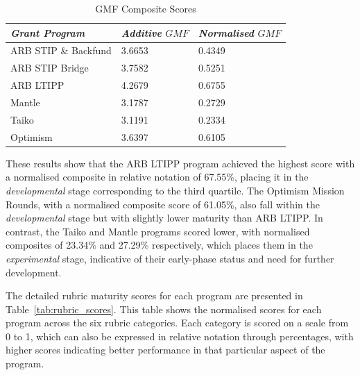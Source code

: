 \documentclass[conference]{IEEEtran}
\begin{document}
\begin{table}[htbp]
\caption{GMF Composite Scores}
\centering
\footnotesize
\begin{tabular}{p{2.7cm}p{2cm}p{2.3cm}}
\hline
\textbf{\textit{Grant Program}} & \textbf{\textit{Additive} \( GMF\)} & \textbf{\textit{Normalised} \( GMF \)} \\
\hline
ARB STIP \& Backfund & 3.6653 & 0.4349 \\
ARB STIP Bridge & 3.7582 & 0.5251 \\
ARB LTIPP & 4.2679 & 0.6755 \\
Mantle & 3.1787 & 0.2729 \\
Taiko & 3.1191 & 0.2334 \\
Optimism & 3.6397 & 0.6105 \\
\hline
\end{tabular}
\label{tab:gmf_composite_score}
\end{table}

These results show that the ARB LTIPP program achieved the highest score with a normalised composite in relative notation of 67.55\%, placing it in the \textit{developmental} stage corresponding to the third quartile. The Optimism Mission Rounds, with a normalised composite score of 61.05\%, also fall within the \textit{developmental} stage but with slightly lower maturity than ARB LTIPP. In contrast, the Taiko and Mantle programs scored lower, with normalised composites of 23.34\% and 27.29\% respectively, which places them in the \textit{experimental} stage, indicative of their early-phase status and need for further development.

The detailed rubric maturity scores for each program are presented in Table~\ref{tab:rubric_scores}. This table shows the normalised scores for each program across the six rubric categories. Each category is scored on a scale from 0 to 1, which can also be expressed in relative notation through percentages, with higher scores indicating better performance in that particular aspect of the program.
\end{document}
